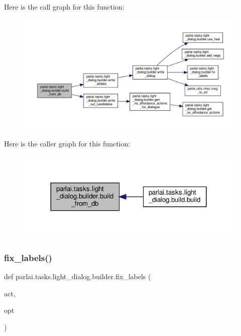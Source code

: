 Here is the call graph for this function\+:
\nopagebreak
\begin{figure}[H]
\begin{center}
\leavevmode
\includegraphics[width=350pt]{namespaceparlai_1_1tasks_1_1light__dialog_1_1builder_a6a049254e487c29d008f875476ffd76f_cgraph}
\end{center}
\end{figure}
Here is the caller graph for this function\+:
\nopagebreak
\begin{figure}[H]
\begin{center}
\leavevmode
\includegraphics[width=312pt]{namespaceparlai_1_1tasks_1_1light__dialog_1_1builder_a6a049254e487c29d008f875476ffd76f_icgraph}
\end{center}
\end{figure}
\mbox{\label{namespaceparlai_1_1tasks_1_1light__dialog_1_1builder_aafb760ba2e05ffe5cad429327d0dd347}} 
\subsubsection{\texorpdfstring{fix\+\_\+labels()}{fix\_labels()}}
{\footnotesize\ttfamily def parlai.\+tasks.\+light\+\_\+dialog.\+builder.\+fix\+\_\+labels (\begin{DoxyParamCaption}\item[{}]{act,  }\item[{}]{opt }\end{DoxyParamCaption})}



